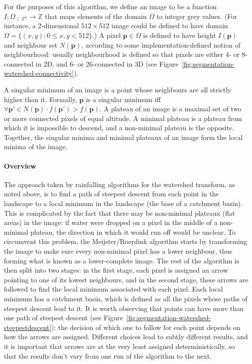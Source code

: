 For the purposes of this algorithm, we define an image to be a function $I: \Omega_{\subset \mathbb{Z}^n} \to \mathbb{Z}$ that maps elements of the domain $\Omega$ to integer grey values. (For instance, a $2$-dimensional $512 \times 512$ image could be defined to have domain $\Omega = \{(x,y) : 0 \le x,y < 512\}$.) A pixel $\mathbf{p} \in \Omega$ is defined to have height $I(\mathbf{p})$ and neighbour set $N(\mathbf{p})$, according to some implementation-defined notion of neighbourhood: usually neighbourhood is defined so that pixels are either 4- or 8-connected in 2D, and 6- or 26-connected in 3D (see Figure~\ref{fig:segmentation-watershed-connectivity}).


A singular minimum of an image is a point whose neighbours are all strictly higher than it. Formally, $\mathbf{p}$ is a singular minimum iff $\forall \mathbf{p'} \in N(\mathbf{p}) \cdot f(\mathbf{p'}) > f(\mathbf{p})$. A plateau of an image is a maximal set of two or more connected pixels of equal altitude. A minimal plateau is a plateau from which it is impossible to descend, and a non-minimal plateau is the opposite. Together, the singular minima and minimal plateaux of an image form the local minima of the image.

\paragraph{Overview} The approach taken by rainfalling algorithms for the watershed transform, as noted above, is to find a path of steepest descent from each point in the landscape to a local minimum in the landscape (the base of a catchment basin). This is complicated by the fact that there may be non-minimal plateaux (flat areas) in the image: if water were dropped on a pixel in the middle of a non-minimal plateau, the direction in which it would run off would be unclear. To circumvent this problem, the Meijster/Roerdink algorithm starts by transforming the image to make sure every non-minimal pixel has a lower neighbour, thus forming what is known as a lower-complete image. The rest of the algorithm is then split into two stages: in the first stage, each pixel is assigned an arrow pointing to one of its lowest neighbours, and in the second stage, these arrows are followed to find the local minimum associated with each pixel. Each local minimum has a catchment basin, which is defined as all the pixels whose paths of steepest descent lead to it. It is worth observing that points can have more than one path of steepest descent (see Figure~\ref{fig:segmentation-watershed-steepestdescent}): the decision of which one to follow for each point depends on how the arrows are assigned. Different choices lead to subtly different results, and it is important that arrows are at the very least assigned deterministically, so that the results don't vary from one run of the algorithm to the next.


